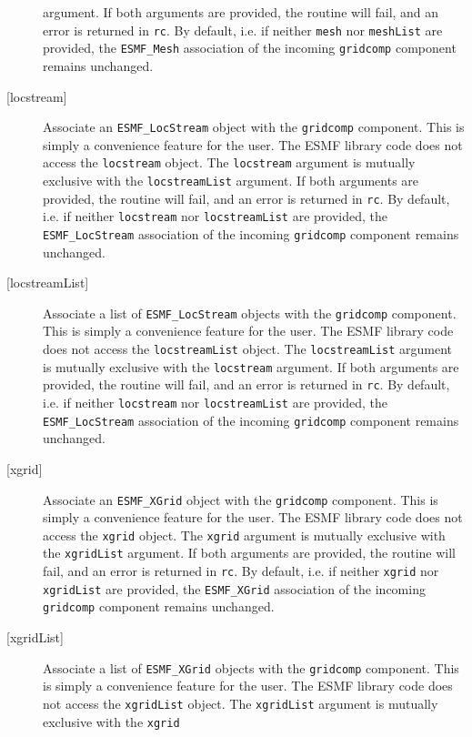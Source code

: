 \begin{description}
     argument. If both arguments are provided, the routine will fail, and an
     error is returned in {\tt rc}.
     By default, i.e. if neither {\tt mesh} nor {\tt meshList} are provided,
     the {\tt ESMF\_Mesh} association of the incoming {\tt gridcomp}
     component remains unchanged.
   \item[{[locstream]}]
     Associate an {\tt ESMF\_LocStream} object with the {\tt gridcomp} component.
     This is simply a convenience feature for the user. The ESMF library code
     does not access the {\tt locstream} object.
     The {\tt locstream} argument is mutually exclusive with the
     {\tt locstreamList}
     argument. If both arguments are provided, the routine will fail, and an
     error is returned in {\tt rc}.
     By default, i.e. if neither {\tt locstream} nor {\tt locstreamList} are
     provided, the {\tt ESMF\_LocStream} association of the incoming
     {\tt gridcomp} component remains unchanged.
   \item[{[locstreamList]}]
     Associate a list of {\tt ESMF\_LocStream} objects with the {\tt gridcomp}
     component.
     This is simply a convenience feature for the user. The ESMF library code
     does not access the {\tt locstreamList} object.
     The {\tt locstreamList} argument is mutually exclusive with the
     {\tt locstream}
     argument. If both arguments are provided, the routine will fail, and an
     error is returned in {\tt rc}.
     By default, i.e. if neither {\tt locstream} nor {\tt locstreamList} are
     provided, the {\tt ESMF\_LocStream} association of the incoming
     {\tt gridcomp} component remains unchanged.
   \item[{[xgrid]}]
     Associate an {\tt ESMF\_XGrid} object with the {\tt gridcomp} component.
     This is simply a convenience feature for the user. The ESMF library code
     does not access the {\tt xgrid} object.
     The {\tt xgrid} argument is mutually exclusive with the {\tt xgridList}
     argument. If both arguments are provided, the routine will fail, and an
     error is returned in {\tt rc}.
     By default, i.e. if neither {\tt xgrid} nor {\tt xgridList} are provided,
     the {\tt ESMF\_XGrid} association of the incoming {\tt gridcomp}
     component remains unchanged.
   \item[{[xgridList]}]
     Associate a list of {\tt ESMF\_XGrid} objects with the {\tt gridcomp}
     component.
     This is simply a convenience feature for the user. The ESMF library code
     does not access the {\tt xgridList} object.
     The {\tt xgridList} argument is mutually exclusive with the {\tt xgrid}

\end{description}
